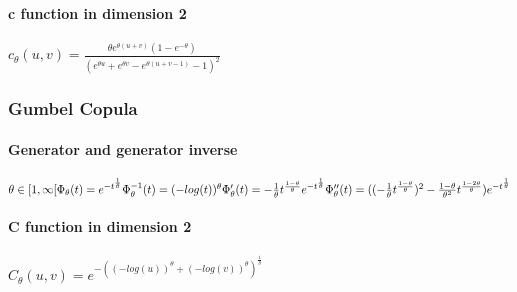\documentclass{article}
\begin{document}
   	\paragraph{c function in dimension 2}
   	
   	\begin{math}
   	c_\theta (u,v) = \frac{\theta e^{\theta (u+v)} (1-e^{-\theta})}{(e^{\theta u}+e^{\theta v}-e^{\theta (u+v-1)}-1)^2}
   	\end{math}
   	
   	
   	\subsubsection{Gumbel Copula}
   	\paragraph{Generator and generator inverse}
   	\begin{math}
   		\theta \in  [1,\infty[ \newline
   		\newline
   		\Phi_{\theta}(t)= e^{-t^{ \frac{1}{\theta} }}
   		\newline
   		\Phi_{\theta}^{-1}(t)=(-log(t))^{\theta} \newline
   		\Phi_{\theta}^\prime (t) = -\frac{1}{\theta} t^{ \frac{1-\theta}{\theta}} e^{-t^{ \frac{1}{\theta} }} \newline
   		\Phi_{\theta}^{\prime \prime} (t) = ((-\frac{1}{\theta} t^{ \frac{1-\theta}{\theta}})^2 - \frac{1-\theta}{\theta^2} t^{ \frac{1-2\theta}{\theta}}) e^{-t^{ \frac{1}{\theta} }}
   	\end{math}
   	\paragraph{C function in dimension 2}
   	\begin{math}
   		C_{\theta}(u,v) = e^{-((-log(u))^{\theta}+(-log(v))^{\theta})^{\frac{1}{\theta}}}
   	\end{math}
\end{document}
